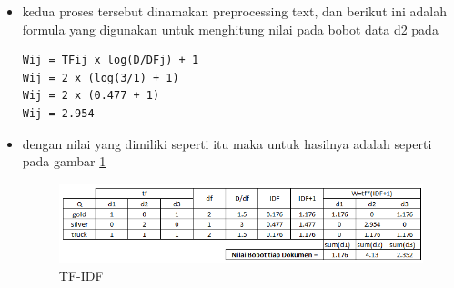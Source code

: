 \begin{enumerate}
\begin{itemize}
\item kedua proses tersebut dinamakan preprocessing text, dan berikut ini adalah formula yang digunakan untuk menghitung nilai pada bobot data d2 pada
\begin{verbatim}
Wij = TFij x log(D/DFj) + 1
Wij = 2 x (log(3/1) + 1)
Wij = 2 x (0.477 + 1)
Wij = 2.954
\end{verbatim}

\item dengan nilai yang dimiliki seperti itu maka untuk hasilnya adalah seperti pada gambar \ref{coba5}
\begin{figure}[!htbp]
	\centering
	\includegraphics[width=1\textwidth]{figures/fathi/chapter4/hari1/5}
	\caption{TF-IDF}
	\label{coba5}
\end{figure}
\end{itemize}
\end{enumerate}

